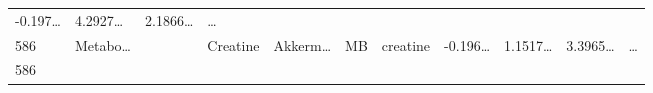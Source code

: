 \documentclass[
]{article}
\begin{document}
\begin{longtable}[]{@{}lllllllllll@{}}
\begin{minipage}[t]{0.07\columnwidth}
-0.197\ldots{}\strut
\end{minipage} & \begin{minipage}[t]{0.07\columnwidth}\raggedright
4.2927\ldots{}\strut
\end{minipage} & \begin{minipage}[t]{0.07\columnwidth}\raggedright
2.1866\ldots{}\strut
\end{minipage} & \begin{minipage}[t]{0.03\columnwidth}\raggedright
\ldots{}\strut
\end{minipage}\tabularnewline
\begin{minipage}[t]{0.03\columnwidth}\raggedright
586\strut
\end{minipage} & \begin{minipage}[t]{0.07\columnwidth}\raggedright
Metabo\ldots{}\strut
\end{minipage} & \begin{minipage}[t]{0.07\columnwidth}\raggedright
\strut
\end{minipage} & \begin{minipage}[t]{0.09\columnwidth}\raggedright
Creatine\strut
\end{minipage} & \begin{minipage}[t]{0.07\columnwidth}\raggedright
Akkerm\ldots{}\strut
\end{minipage} & \begin{minipage}[t]{0.07\columnwidth}\raggedright
MB\strut
\end{minipage} & \begin{minipage}[t]{0.09\columnwidth}\raggedright
creatine\strut
\end{minipage} & \begin{minipage}[t]{0.07\columnwidth}\raggedright
-0.196\ldots{}\strut
\end{minipage} & \begin{minipage}[t]{0.07\columnwidth}\raggedright
1.1517\ldots{}\strut
\end{minipage} & \begin{minipage}[t]{0.07\columnwidth}\raggedright
3.3965\ldots{}\strut
\end{minipage} & \begin{minipage}[t]{0.03\columnwidth}\raggedright
\ldots{}\strut
\end{minipage}\tabularnewline
\begin{minipage}[t]{0.03\columnwidth}\raggedright
586\strut
\end{minipage} & \begin{minipage}[t]{0.07\columnwidth}\raggedright

\end{minipage}
\end{longtable}
\end{document}
